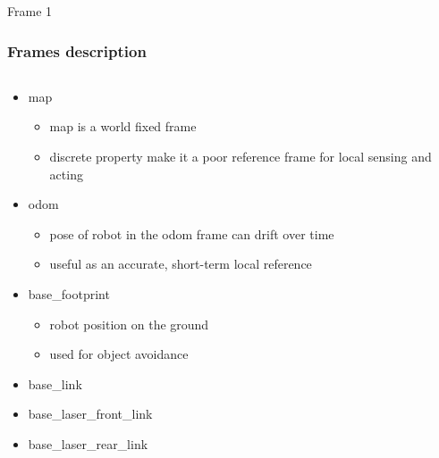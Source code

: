 
\begin{frame}{Frame 1}
\frametitle {Frames description}
 
 \begin{columns}
 \begin{column}{0.7\textwidth}
		\begin{itemize}
		\item map
 			 \begin{itemize}
  				\item map is a world fixed frame
 				 \item discrete property make it a poor reference frame for local sensing and acting
  			\end{itemize}
		\item odom
		\begin{itemize}
			\item  pose of robot in the odom frame can drift over time
			\item  useful as an accurate, short-term local reference
		\end{itemize}
	\item base\_footprint
		\begin{itemize}
		\item robot position on the ground
		\item used for object avoidance
		\end{itemize}
	\item base\_link
	\item base\_laser\_front\_link
	\item base\_laser\_rear\_link
	\end{itemize}
\end{column} 
 


\end{columns}
\end{frame}
